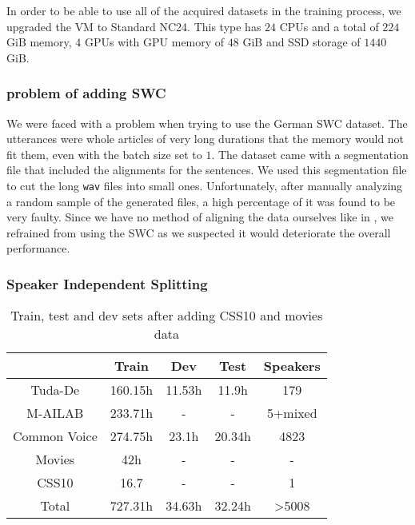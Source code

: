 In order to be able to use all of the acquired datasets in the training process, we upgraded the \ac{VM} to Standard NC24. This type has $24$ CPUs and a total of $224$ GiB memory, $4$ GPUs with GPU memory of $48$ GiB and SSD storage of $1440$ GiB.


\subsubsection{problem of adding \ac{SWC}} 
\label{meth:s4_sub4_subsub1}

We were faced with a problem when trying to use the German \ac{SWC} dataset. The utterances were whole articles of very long durations that the memory would not fit them, even with the batch size set to $1$. The dataset came with a segmentation file that included the alignments for the sentences. We used this segmentation file to cut the long \texttt{wav} files into small ones. Unfortunately, after manually analyzing a random sample of the generated files, a high percentage of it was found to be very faulty. Since we have no method of aligning the data ourselves like in \cite{amodei2016deep}, we refrained from using the \ac{SWC} as we suspected it would deteriorate the overall performance.

\subsubsection{Speaker Independent Splitting}
\label{meth:s4_sub4_subsub2}

\begin{table}
	\centering
	\begin{tabular}{ | c | c | c | c | c | } 
		\hline
		& Train   & Dev    & Test   & Speakers  \\ 
		\hline
		Tuda-De      & 160.15h & 11.53h & 11.9h  & 179       \\
		\hline
		M-AILAB      & 233.71h & -      &   -    & 5+mixed   \\ 
		\hline
		Common Voice & 274.75h & 23.1h  & 20.34h & 4823      \\
		\hline
		Movies       & 42h     & -      & -      & -         \\
		\hline
		CSS10        & 16.7    & -      & -      & 1         \\
		\hline
		Total        & 727.31h & 34.63h & 32.24h & >5008     \\
		\hline
	\end{tabular}
	\caption{Train, test and dev sets after adding CSS10 and movies data}
	\label{meth:table3}
\end{table}

